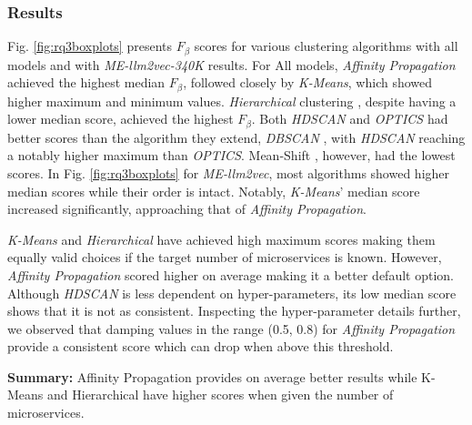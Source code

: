 \subsubsection{Results}

Fig. \ref{fig:rq3boxplots} presents $F_\beta$ scores for various clustering algorithms with all models and with \textit{ME-llm2vec-340K} results. For All models, \textit{Affinity Propagation} \cite{brenden2007affinity} achieved the highest median $F_\beta$, followed closely by \textit{K-Means}, which showed higher maximum and minimum values. \textit{Hierarchical} clustering \cite{ward1963hierarchical}, despite having a lower median score, achieved the highest $F_\beta$. Both \textit{HDSCAN} \cite{ricardo2013hdbscan} and \textit{OPTICS} \cite{ankerst1999optics} had better scores than the algorithm they extend, \textit{DBSCAN} \cite{ester1996dbscan}, with \textit{HDSCAN} reaching a notably higher maximum than \textit{OPTICS}. Mean-Shift \cite{comaniciu2002meanshift}, however, had the lowest scores. In Fig. \ref{fig:rq3boxplots} for \textit{ME-llm2vec}, most algorithms showed higher median scores while their order is intact. Notably, \textit{K-Means}' median score increased significantly, approaching that of \textit{Affinity Propagation}.

\textit{K-Means} and \textit{Hierarchical} have achieved high maximum scores making them equally valid choices if the target number of microservices is known. However, \textit{Affinity Propagation} scored higher on average making it a better default option. Although \textit{HDSCAN} is less dependent on hyper-parameters, its low median score shows that it is not as consistent. Inspecting the hyper-parameter details further, we observed that damping values in the range (0.5, 0.8) for \textit{Affinity Propagation} provide a consistent score which can drop when above this threshold. 


\begin{tcolorbox}[colback=gray!10!white, colframe=gray!90!black]
\textbf{Summary:} Affinity Propagation provides on average better results while K-Means and Hierarchical have higher scores when given the number of microservices.
\end{tcolorbox}